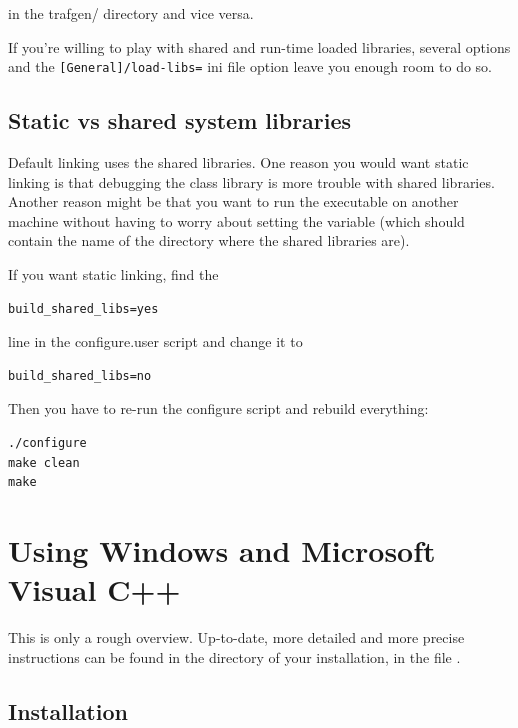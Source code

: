 in the trafgen/ directory and vice versa.


If you're willing to play with shared and run-time loaded libraries,
several  options and the
\texttt{[General]/load-libs=} ini file option leave you enough room to
do so.





\subsection{Static vs shared {\opp} system libraries}

Default linking uses the shared libraries. One
reason you would want static linking is that
debugging the {\opp} class library is more trouble
with shared libraries. Another reason might be that you want to run
the executable on another machine without having to worry about
setting the  variable (which should contain the name
of the directory where the {\opp} shared libraries are).

If you want static linking, find the

\begin{verbatim}
build_shared_libs=yes
\end{verbatim}


line in the configure.user script and change it to

\begin{verbatim}
build_shared_libs=no
\end{verbatim}

Then you have to re-run the configure script and rebuild everything:

\begin{verbatim}
./configure
make clean
make
\end{verbatim}



\section{Using Windows and Microsoft Visual C++}

This is only a rough overview. Up-to-date, more detailed and more
precise instructions can be found in the  directory
of your {\opp} installation, in the file .


\subsection{Installation}

